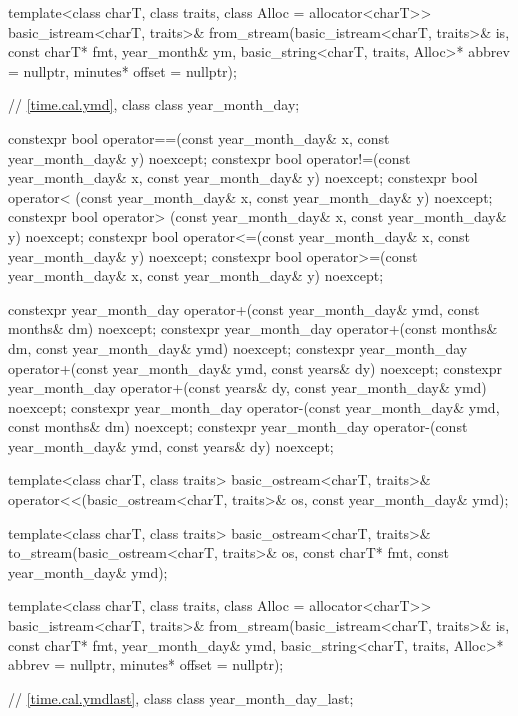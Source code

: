 \begin{codeblock}
{{    template<class charT, class traits, class Alloc = allocator<charT>>
      basic_istream<charT, traits>&
        from_stream(basic_istream<charT, traits>& is, const charT* fmt,
                    year_month& ym, basic_string<charT, traits, Alloc>* abbrev = nullptr,
                    minutes* offset = nullptr);

    // \ref{time.cal.ymd}, class 
    class year_month_day;

    constexpr bool operator==(const year_month_day& x, const year_month_day& y) noexcept;
    constexpr bool operator!=(const year_month_day& x, const year_month_day& y) noexcept;
    constexpr bool operator< (const year_month_day& x, const year_month_day& y) noexcept;
    constexpr bool operator> (const year_month_day& x, const year_month_day& y) noexcept;
    constexpr bool operator<=(const year_month_day& x, const year_month_day& y) noexcept;
    constexpr bool operator>=(const year_month_day& x, const year_month_day& y) noexcept;

    constexpr year_month_day operator+(const year_month_day& ymd, const months& dm) noexcept;
    constexpr year_month_day operator+(const months& dm, const year_month_day& ymd) noexcept;
    constexpr year_month_day operator+(const year_month_day& ymd, const years& dy) noexcept;
    constexpr year_month_day operator+(const years& dy, const year_month_day& ymd) noexcept;
    constexpr year_month_day operator-(const year_month_day& ymd, const months& dm) noexcept;
    constexpr year_month_day operator-(const year_month_day& ymd, const years& dy) noexcept;

    template<class charT, class traits>
      basic_ostream<charT, traits>&
        operator<<(basic_ostream<charT, traits>& os, const year_month_day& ymd);

    template<class charT, class traits>
      basic_ostream<charT, traits>&
        to_stream(basic_ostream<charT, traits>& os, const charT* fmt,
                  const year_month_day& ymd);

    template<class charT, class traits, class Alloc = allocator<charT>>
      basic_istream<charT, traits>&
        from_stream(basic_istream<charT, traits>& is, const charT* fmt,
                    year_month_day& ymd,
                    basic_string<charT, traits, Alloc>* abbrev = nullptr,
                    minutes* offset = nullptr);

    // \ref{time.cal.ymdlast}, class 
    class year_month_day_last;

}}
\end{codeblock}
